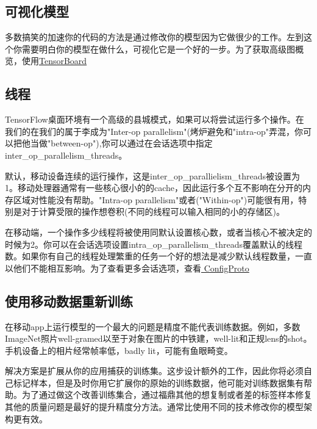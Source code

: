 \subsection{可视化模型}
多数搞笑的加速你的代码的方法是通过修改你的模型因为它做很少的工作。左到这个你需要明白你的模型在做什么，可视化它是一个好的一步。为了获取高级图概览，使用\href{https://github.com/tensorflow/tensorboard}{TensorBoard}
\subsection{线程}
TensorFlow桌面环境有一个高级的县城模式，如果可以将尝试运行多个操作。在我们的在我们的属于李成为"Inter-op parallelism"(烤炉避免和"intra-op"弄混，你可以把他当做"between-op"),你可以通过在会话选项中指定inter\_op\_parallelism\_threads。

默认，移动设备连续的运行操作，这是inter\_op\_parallielism\_threads被设置为1。移动处理器通常有一些核心很小的的cache，因此运行多个互不影响在分开的内存区域对性能没有帮助。"Intra-op parallelism"或者("Within-op")可能很有用，特别是对于计算受限的操作想卷积(不同的线程可以输入相同的小的存储区)。

在移动端，一个操作多少线程将被使用同默认设置核心数，或者当核心不被决定的时候为2。你可以在会话选项设置intra\_op\_parallelism\_threads覆盖默认的线程数。如果你有自己的线程处理繁重的任务一个好的想法是减少默认线程数量，一直以他们不能相互影响。为了查看更多会话选项，查看\href{https://www.github.com/tensorflow/tensorflow/blob/r1.4/tensorflow/core/protobuf/config.proto}{ ConfigProto}
\subsection{使用移动数据重新训练}
在移动app上运行模型的一个最大的问题是精度不能代表训练数据。例如，多数ImageNet照片well-gramed以至于对象在图片的中铁建，well-lit和正规lens的shot。手机设备上的相片经常帧率低，badly lit，可能有鱼眼畸变。

解决方案是扩展从你的应用捕获的训练集。这步设计额外的工作，因此你将必须自己标记样本，但是及时你用它扩展你的原始的训练数据，他可能对训练数据集有帮助。为了通过做这个改善训练集合，通过福鼎其他的想复制或者差的标签样本修复其他的质量问题是最好的提升精度分方法。通常比使用不同的技术修改你的模型架构更有效。

